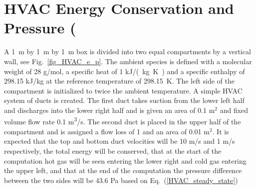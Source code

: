 \documentclass[11pt]{book}
\begin{document}
\clearpage

\section{HVAC Energy Conservation and Pressure (\texorpdfstring{})}

A 1~m by 1~m by 1~m box is divided into two equal compartments by a vertical wall, see Fig.~\ref{fig_HVAC_e_p}.
The ambient species is defined with a molecular weight of 28 g/mol, a specific heat of 1 \si{kJ/(kg.K)} and a specific enthalpy of 298.15 kJ/kg at the reference temperature of 298.15~K.
The left side of the compartment is initialized to twice the ambient temperature.  A simple HVAC system of ducts is created.
The first duct takes suction from the lower left half and discharges into the lower right half and is given an area of 0.1 m$^2$ and fixed volume flow rate 0.1 \si{m^3/s}.
The second duct is placed in the upper half of the compartment and is assigned a flow loss of 1 and an area of 0.01 m$^2$.  It is expected that the top and bottom duct velocities will be 10 m/s and 1 m/s respectively, the total energy will be conserved, that at the start of the computation hot gas will be seen entering the lower right and cold gas entering the upper left, and that at the end of the computation the pressure difference between the two sides will be 43.6 Pa based on Eq.~(\ref{HVAC_steady_state})
\end{document}
